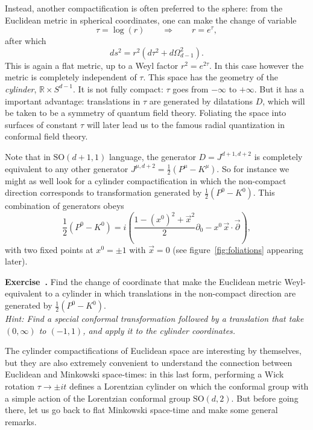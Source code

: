 \documentclass[a4paper,12pt]{article}
\newcommand{\SO}{\text{SO}}
\numberwithin{equation}{section}
\newcounter{exercise}[section]
\newenvironment{exercise}[1][]%
	{\refstepcounter{exercise}\bigskip
	\begin{mdframed}[backgroundcolor=gray!20, linewidth=0]
	\noindent\textbf{Exercise~\thesection.\theexercise #1} \rmfamily}
  	{\end{mdframed}\bigskip}
\newcommand\hint[1]{\emph{Hint: #1}}
\begin{document}
Instead, another compactification is often preferred to the sphere: from the Euclidean metric in spherical coordinates, one can make the change of variable
\begin{equation}
	\tau = \log(r)
	\qquad\Rightarrow\qquad
	r = e^\tau,
\end{equation}
after which
\begin{equation}
	ds^2 = r^2 \left( d\tau^2 + d\Omega_{d-1}^2 \right).
\end{equation}
This is again a flat metric, up to a Weyl factor $r^2 = e^{2\tau}$. In this case however the metric is completely independent of $\tau$.
This space has the geometry of the \emph{cylinder}, $\mathds{R} \times S^{d-1}$. It is not fully compact: $\tau$ goes from $-\infty$ to $+\infty$. But it has a important advantage: translations in $\tau$ are generated by dilatations $D$, which will be taken to be a symmetry of quantum field theory. Foliating the space into surfaces of constant $\tau$ will later lead us to the famous radial quantization in conformal field theory.

Note that in $\SO(d + 1, 1)$ language, the generator $D = J^{d+1, d+2}$ is completely equivalent to any other generator $J^{\mu, d+2} = \frac{1}{2} \left( P^\mu - K^\mu \right)$. So for instance we might as well look for a cylinder compactification in which the non-compact direction corresponds to transformation generated by
$\frac{1}{2} \left( P^0 - K^0 \right)$. This combination of generators obeys
\begin{equation}
	\frac{1}{2} \left( P^0 - K^0 \right)
	= i \left( \frac{1 - (x^0)^2 + \vec{x}^2}{2} \partial_0
	- x^0 \, \vec{x} \cdot \vec{\partial} \right),
\end{equation}
with two fixed points at $x^0 = \pm 1$ with $\vec{x} = 0$ 
(see figure~\ref{fig:foliations} appearing later).

\begin{exercise}
	Find the change of coordinate that make the Euclidean metric Weyl-equivalent to a cylinder in which translations in the non-compact direction are generated by $\frac{1}{2} \left( P^0 - K^0 \right)$. \\
	\hint{Find a special conformal transformation followed by a translation that take $(0, \infty)$ to $(-1, 1)$, and apply it to the cylinder coordinates.}
\end{exercise}

The cylinder compactifications of Euclidean space are interesting by themselves, but they are also extremely convenient to understand the connection between Euclidean and Minkowski space-times: in this last form, performing a Wick rotation $\tau \to \pm i t$ defines a Lorentzian cylinder on which the conformal group with a simple action of the Lorentzian conformal group $\SO(d, 2)$. 
But before going there, let us go back to flat Minkowski space-time and make some general remarks.
\end{document}
